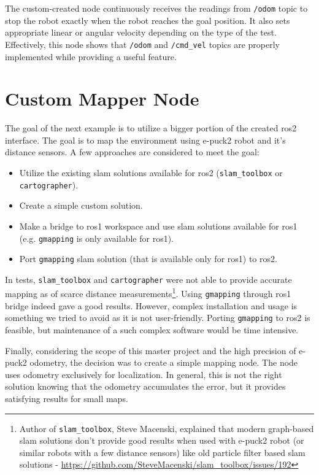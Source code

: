 The custom-created node continuously receives the readings from \texttt{/odom} topic to stop the robot exactly when the robot reaches the goal position.
It also sets appropriate linear or angular velocity depending on the type of the test.
Effectively, this node shows that \texttt{/odom} and \texttt{/cmd\_vel} topics are properly implemented while providing a useful feature.

\section{Custom Mapper Node}
The goal of the next example is to utilize a bigger portion of the created \ac{ros2} interface.
The goal is to map the environment using e-puck2 robot and it's distance sensors.
A few approaches are considered to meet the goal:
\begin{itemize}
    \item Utilize the existing \ac{slam} solutions available for \ac{ros2} (\texttt{slam\_toolbox} or \texttt{cartographer}).
    \item Create a simple custom solution.
    \item Make a bridge to \ac{ros}1 workspace and use \ac{slam} solutions available for \ac{ros}1 (e.g. \texttt{gmapping} is only available for \ac{ros}1).
    \item Port \texttt{gmapping} \ac{slam} solution (that is available only for \ac{ros}1) to \ac{ros2}.
\end{itemize}

In tests, \texttt{slam\_toolbox} and \texttt{cartographer} were not able to provide accurate mapping as of scarce distance measurements\footnote{Author of \texttt{slam\_toolbox}, Steve Macenski, explained that modern graph-based \ac{slam} solutions don't provide good results when used with e-puck2 robot (or similar robots with a few distance sensors) like old particle filter based \ac{slam} solutions - \url{https://github.com/SteveMacenski/slam_toolbox/issues/192}}. Using \texttt{gmapping} through \ac{ros}1 bridge indeed gave a good results.
However, complex installation and usage is something we tried to avoid as it is not user-friendly.
Porting \texttt{gmapping} to \ac{ros2} is feasible, but maintenance of a such complex software would be time intensive.

Finally, considering the scope of this master project and the high precision of e-puck2 odometry, the decision was to create a simple mapping node.
The node uses odometry exclusively for localization.
In general, this is not the right solution knowing that the odometry accumulates the error, but it provides satisfying results for small maps. 


